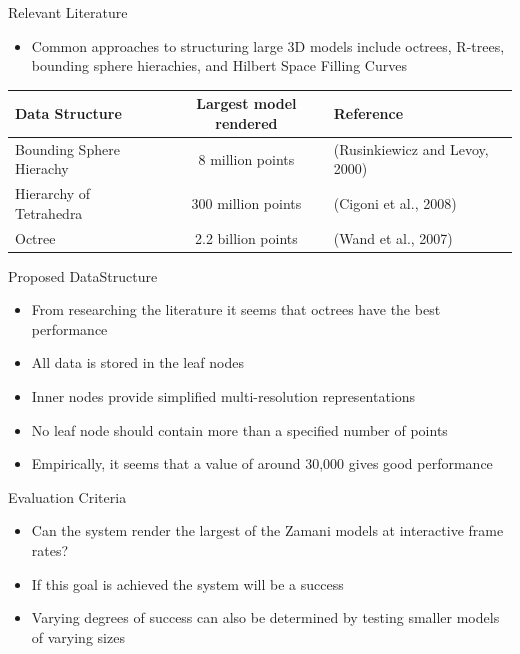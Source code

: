 \documentclass{beamer}
\begin{document}
\begin{frame}{Relevant Literature}

\begin{itemize}
\item Common approaches to structuring large 3D models include octrees,
  R-trees, bounding sphere hierachies, and Hilbert Space Filling
  Curves
\end{itemize}
{\scriptsize
\begin{tabular}{l|c|l}
 Data Structure & Largest model rendered & Reference \\
\hline
\hline
Bounding Sphere Hierachy  & 8 million points & (Rusinkiewicz and Levoy, 2000) \\
\hline
Hierarchy of Tetrahedra   & 300 million points& (Cigoni et al., 2008)  \\
\hline
Octree          & 2.2 billion points& (Wand et al., 2007)    \\
\end{tabular}}

\end{frame}


\begin{frame}{Proposed DataStructure}

\begin{itemize}
\item From researching the literature it seems that octrees have the best
  performance
\item All data is stored in the leaf nodes
\item Inner nodes provide simplified multi-resolution representations
\item No leaf node should contain more than a specified number of points
\item Empirically, it seems that a value of around 30,000 gives good performance
\end{itemize}
\end{frame}


\begin{frame}{Evaluation Criteria}
\begin{itemize}
\item Can the system render the largest of the Zamani models at interactive
  frame rates?
\item If this goal is achieved the system will be a success
\item Varying degrees of success can also be determined by testing smaller
  models of varying sizes
\end{itemize}
\end{frame}
\end{document}
